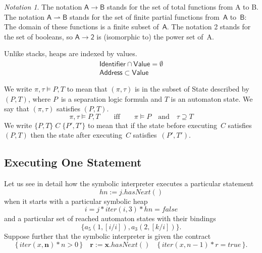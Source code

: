 \documentclass[a4paper]{article}
\newcommand{\pmap}{\rightharpoonup}
\theoremstyle{remark}
\newtheorem*{notation}{Notation}
\begin{document}
\begin{notation}
The notation $\mathsf A\to\mathsf B$ stands for the set of total functions from \textsf A to \textsf B.
The notation $\mathsf A\pmap\mathsf B$ stands for the set of finite partial functions from~$\mathsf A$ to~$\mathsf B$: 
The domain of these functions is a finite subset of~$\mathsf A$.
The notation \textsf 2 stands for the set of booleans, so $\mathsf A\to\mathsf 2$ is (isomorphic to) the power set of~\textsf A.
\end{notation}

Unlike stacks, heaps are indexed by values.
\begin{gather}
\mathsf{Identifier}\cap\mathsf{Value}=\emptyset \\
\mathsf{Address}\subset\mathsf{Value}
\end{gather}

We write $\pi,\tau\vDash P,T$ to mean that $(\pi,\tau)$ is in the subset of \textsf{State} described by~$(P,T)$, where $P$~is a separation logic formula and $T$ is an automaton state.
We say that $(\pi,\tau)$ satisfies $(P,T)$.
\begin{equation}
\pi, \tau \vDash P, T 
  \qquad\text{iff}\qquad
\pi \vDash P
  \quad\text{and}\quad
\tau\supseteq T
\end{equation}
We write $\{P,T\}\;C\;\{P',T'\}$ to mean that if the state before executing~$C$ satisfies $(P,T)$ then the state after executing~$C$ satisfies~$(P',T')$.

\subsection{Executing One Statement}\label{sec:execute} %

Let us see in detail how the symbolic interpreter executes a particular statement
\begin{equation}\label{eq:execute.statement}
\mathit{hn}:=j.\mathit{hasNext}()
\end{equation}
when it starts with a particular symbolic heap
\begin{equation}\label{eq:execute.heap}
i=j * \mathit{iter}(i,3) * \mathit{hn} = \mathit{false}
\end{equation}
and a particular set of reached automaton states with their bindings
\begin{equation}\label{eq:execute.props}
\{a_5(1,[i/i]), a_3(2,[k/i])\}.
\end{equation}
Suppose further that the symbolic interpreter is given the contract
\begin{equation}\label{eq:execute.spec}
\{\,\mathit{iter}(x, \mathbf{n})*n>0\,\}
  \quad \mathbf{r} := \mathbf{x}.\mathit{hasNext}()
  \quad \{\,\mathit{iter}(x, n-1)*r=\mathit{true}\,\}.
\end{equation}
\end{document}
